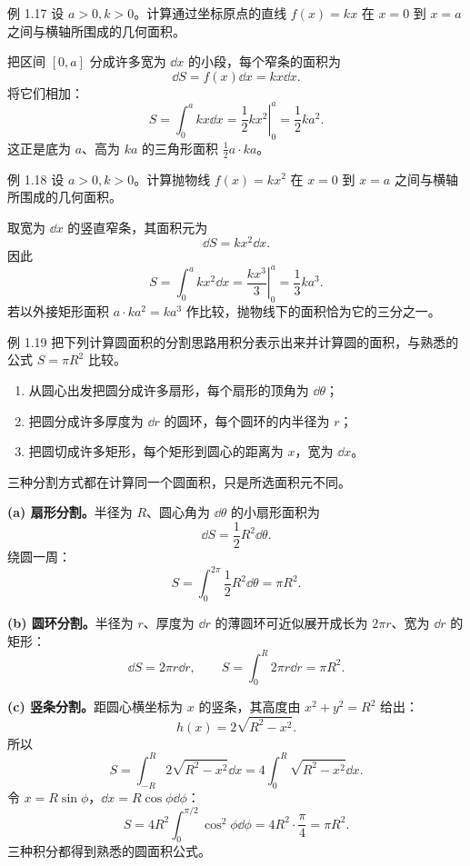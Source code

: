 \begin{origexamplebox}{例 1.17}
设 $a>0,k>0$。计算通过坐标原点的直线 $f(x)=kx$ 在 $x=0$ 到 $x=a$ 之间与横轴所围成的几何面积。
\areaLineDiagram
\end{origexamplebox}

\begin{xesolution}
把区间 $[0,a]$ 分成许多宽为 $\dd x$ 的小段，每个窄条的面积为
\[
 \dd S=f(x)\dd x=kx\dd x.
\]
将它们相加：
\[
 S=\int_0^a kx\dd x
 =\left.\frac12kx^2\right|_0^a
 =\boxed{\frac12ka^2}.
\]
这正是底为 $a$、高为 $ka$ 的三角形面积 $\frac12a\cdot ka$。
\end{xesolution}

\Needspace{0.32\textheight}
\begin{origexamplebox}{例 1.18}
设 $a>0,k>0$。计算抛物线 $f(x)=kx^2$ 在 $x=0$ 到 $x=a$ 之间与横轴所围成的几何面积。
\areaParabolaDiagram
\end{origexamplebox}

\begin{xesolution}
取宽为 $\dd x$ 的竖直窄条，其面积元为
\[
 \dd S=kx^2\dd x.
\]
因此
\[
 S=\int_0^a kx^2\dd x
 =\left.\frac{kx^3}{3}\right|_0^a
 =\boxed{\frac13ka^3}.
\]
若以外接矩形面积 $a\cdot ka^2=ka^3$ 作比较，抛物线下的面积恰为它的三分之一。
\end{xesolution}

\Needspace{0.42\textheight}
\begin{origexamplebox}{例 1.19}
把下列计算圆面积的分割思路用积分表示出来并计算圆的面积，与熟悉的公式
$S=\pi R^2$ 比较。
\begin{enumerate}[label=(\alph*),leftmargin=2.2em]
 \item 从圆心出发把圆分成许多扇形，每个扇形的顶角为 $\dd\theta$；
 \item 把圆分成许多厚度为 $\dd r$ 的圆环，每个圆环的内半径为 $r$；
 \item 把圆切成许多矩形，每个矩形到圆心的距离为 $x$，宽为 $\dd x$。
\end{enumerate}
\circlePartitionsDiagram
\end{origexamplebox}

\begin{xesolution}
三种分割方式都在计算同一个圆面积，只是所选面积元不同。

\textbf{(a) 扇形分割。}\quad 半径为 $R$、圆心角为 $\dd\theta$ 的小扇形面积为
\[
 \dd S=\frac12R^2\dd\theta.
\]
绕圆一周：
\[
 S=\int_0^{2\pi}\frac12R^2\dd\theta
 =\boxed{\pi R^2}.
\]

\textbf{(b) 圆环分割。}\quad 半径为 $r$、厚度为 $\dd r$ 的薄圆环可近似展开成长为
$2\pi r$、宽为 $\dd r$ 的矩形：
\[
 \dd S=2\pi r\dd r,
 \qquad
 S=\int_0^R2\pi r\dd r=\boxed{\pi R^2}.
\]

\textbf{(c) 竖条分割。}\quad 距圆心横坐标为 $x$ 的竖条，其高度由
$x^2+y^2=R^2$ 给出：
\[
 h(x)=2\sqrt{R^2-x^2}.
\]
所以
\[
 S=\int_{-R}^{R}2\sqrt{R^2-x^2}\dd x
 =4\int_0^R\sqrt{R^2-x^2}\dd x.
\]
令 $x=R\sin\phi$，$\dd x=R\cos\phi\dd\phi$：
\[
 S=4R^2\int_0^{\pi/2}\cos^2\phi\dd\phi
 =4R^2\cdot\frac\pi4
 =\boxed{\pi R^2}.
\]
三种积分都得到熟悉的圆面积公式。
\end{xesolution}

